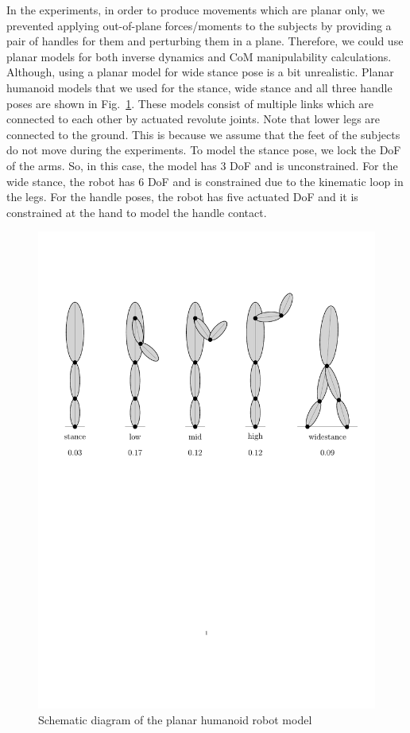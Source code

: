 In the experiments, in order to produce movements which are planar only, we
prevented applying out-of-plane forces/moments to the subjects by providing a
pair of handles for them and perturbing them in a plane.  Therefore, we could
use planar models for both inverse dynamics and CoM manipulability
calculations.  Although, using a planar model for wide stance pose is a bit
unrealistic.  Planar humanoid models that we used for the stance, wide stance
and all three handle poses are shown in Fig.~\ref{planarhumanoids}.  These
models consist of multiple links which are connected to each other by actuated
revolute joints.  Note that lower legs are connected to the ground.  This is
because we assume that the feet of the subjects do not move during the
experiments.  To model the stance pose, we lock the DoF of the arms.  So, in
this case, the model has 3 DoF and is unconstrained.  For the wide stance, the
robot has 6 DoF and is constrained due to the kinematic loop in the legs.  For
the handle poses, the robot has five actuated DoF and it is constrained at the
hand to model the handle contact.
\begin{figure}
  \centering \includegraphics[trim = 13mm 154mm 10mm 37mm, clip,
    scale=0.85]{Morteza/figs/robotmodels}
  \caption{Schematic diagram of the planar humanoid robot model}
  \label{planarhumanoids}
\end{figure}

